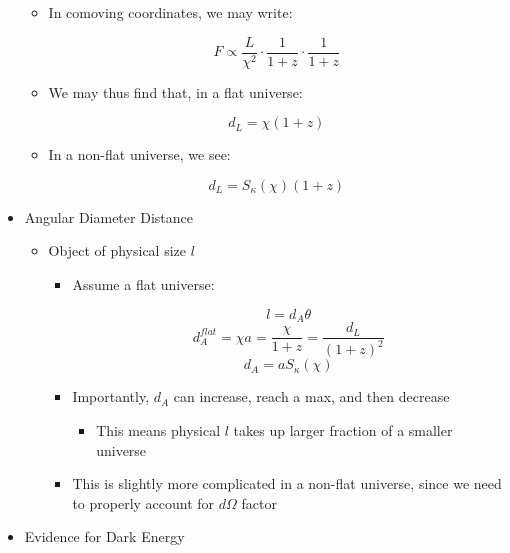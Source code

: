 \begin{itemize}
\begin{itemize}
      \item In comoving coordinates, we may write:

        $$F\propto\frac{L}{\chi^2}\cdot\frac{1}{1+z}\cdot\frac{1}{1+z}$$

      \item We may thus find that, in a flat universe:

        $$d_L=\chi(1+z)$$

      \item In a non-flat universe, we see:

        $$d_L=S_{\kappa}(\chi)(1+z)$$

    \end{itemize}

  \item Angular Diameter Distance

    \begin{itemize}

      \item Object of physical size $l$

        \begin{itemize}

          \item Assume a flat universe:

            $$l=d_A\theta$$
            $$d_A^{flat}=\chi a=\frac{\chi}{1+z}=\frac{d_L}{(1+z)^2}$$
            $$d_A=aS_{\kappa}(\chi)$$

          \item Importantly, $d_A$ can increase, reach a max, and then decrease

            \begin{itemize}

              \item This means physical $l$ takes up larger fraction of a smaller universe

            \end{itemize}

          \item This is slightly more complicated in a non-flat universe, since we need to properly account for $d\Omega$ factor

        \end{itemize}

    \end{itemize}

  \item Evidence for Dark Energy

    \begin{itemize}


\end{itemize}
\end{itemize}
